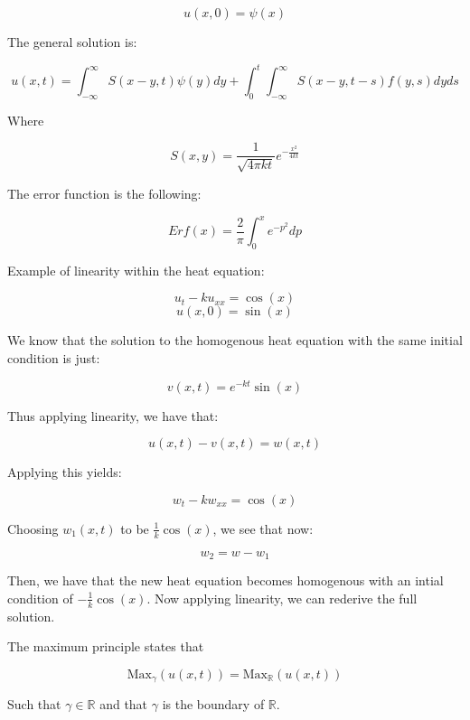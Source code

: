 \documentclass{article}
\begin{document}
\begin{equation}
    u(x,0) = \psi(x)
\end{equation}

The general solution is:

\begin{equation}
    u(x,t) = \int_{-\infty}^{\infty}S(x-y,t)\psi(y)dy + \int_{0}^{t}\int_{-\infty}^{\infty}S(x-y,t-s)f(y,s)dyds
\end{equation}

Where 

\begin{equation}
    S(x,y) = \frac{1}{\sqrt{4\pi kt}}e^{-\frac{x^2}{4kt}}
\end{equation}

The error function is the following:

\begin{equation}
    Erf(x) = \frac{2}{\pi}\int_{0}^{x}e^{-p^2}dp
\end{equation}

Example of linearity within the heat equation:

\begin{equation}
    u_t - ku_{xx} = \cos(x) 
\end{equation}
\begin{equation}
    u(x,0) = \sin(x)
\end{equation}

We know that the solution to the homogenous heat equation with the same initial condition is just:

\begin{equation}
    v(x,t) = e^{-kt}\sin(x)
\end{equation}

Thus applying linearity, we have that:

\begin{equation}
    u(x,t) - v(x,t) = w(x,t)
\end{equation}

Applying this yields:

\begin{equation}
    w_t - kw_{xx} = \cos(x)
\end{equation}

Choosing $w_1(x,t)$ to be $\frac{1}{k}\cos(x)$, we see that now:

\begin{equation}
    w_2 = w - w_1
\end{equation}

Then, we have that the new heat equation becomes homogenous with an intial condition of $-\frac{1}{k}\cos(x)$. Now applying linearity, we can rederive the full solution. 


The maximum principle states that 

\begin{equation}
    \textrm{Max}_{\gamma}(u(x,t)) = \textrm{Max}_{\mathbb{R}}(u(x,t))
\end{equation}

Such that $\gamma \in \mathbb{R}$ and that $\gamma$ is the boundary of $\mathbb{R}$.
\end{document}
